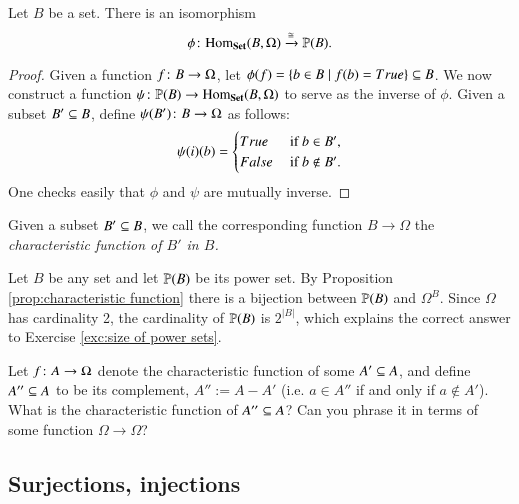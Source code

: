 \begin{proposition}\label{prop:characteristic function}

Let $B$ be a set. There is an isomorphism $$\phi\taking\Hom_\Set(B,\Omega)\To{\iso}\PP(B).$$

\end{proposition}

\begin{proof}

Given a function $f\taking B\to\Omega$, let $\phi(f)=\{b\in B\|f(b)=True\}\ss B$. We now construct a function $\psi\taking\PP(B)\to\Hom_\Set(B,\Omega)$ to serve as the inverse of $\phi$. Given a subset $B'\ss B$, define $\psi(B')\taking B\to\Omega$ as follows: 
$$\psi(i)(b)=\begin{cases}
True&\tn{ if } b\in B',\\
False&\tn{ if } b\not\in B'.
\end{cases}
$$
One checks easily that $\phi$ and $\psi$ are mutually inverse.

\end{proof}

\begin{definition}

Given a subset $B'\ss B$, we call the corresponding function $B\to\Omega$ the {\em characteristic function of $B'$ in $B$.}

\end{definition}

Let $B$ be any set and let $\PP(B)$ be its power set. By Proposition \ref{prop:characteristic function} there is a bijection between $\PP(B)$ and $\Omega^B$. Since $\Omega$ has cardinality 2, the cardinality of $\PP(B)$ is $2^{|B|}$, which explains the correct answer to Exercise \ref{exc:size of power sets}.

\begin{exercise}
Let $f\taking A\to\Omega$ denote the characteristic function of some $A'\ss A$, and define $A''\ss A$ to be its complement, $A'':=A-A'$ (i.e. $a\in A''$ if and only if $a\not\in A'$). 
\sexc What is the characteristic function of $A''\ss A$? 
\next Can you phrase it in terms of some function $\Omega\to\Omega$?
\endsexc
\end{exercise}


\subsection{Surjections, injections}

